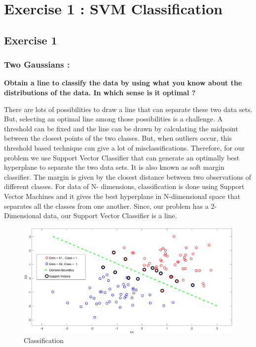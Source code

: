 \chapter{Exercise 1 : SVM Classification}
\section{Exercise 1}
\subsection{Two Gaussians :}	
{\textbf{Obtain a line to classify the data by using what you know about the distributions of the data. In which sense is it optimal ?}
	
	There are lots of possibilities to draw a line that can separate these two data sets. But, selecting an optimal line among those possibilities is a challenge. A threshold can be fixed and the line can be drawn by calculating the midpoint between the closest points of the two classes. But, when outliers occur, this threshold based technique can give a lot of misclassifications. Therefore, for our problem we use Support Vector Classifier that can generate an optimally best hyperplane to separate the two data sets. It is also known as soft margin classifier. The margin is given by the closest distance between two observations of different classes. For data of N- dimensions, classification is done using Support Vector Machines and it gives the best hyperplane in N-dimensional space that separates all the classes from one another. Since, our problem has a 2-Dimensional data, our Support Vector Classifier is a line.
	 \begin{figure}
	 	\begin{center}
	 		\includegraphics[height=5.5 cm,width= 9 cm]{Exercise1/Report/Ex1.1.eps} 
	 		\caption{Classification}
	 		\label{fig:SVC}
	 	\end{center}
	\end{figure}
 
}
